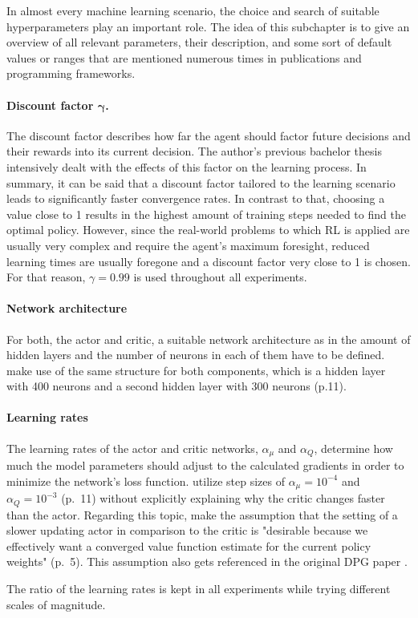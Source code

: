 In almost every machine learning scenario, the choice and search of suitable hyperparameters play an important role. The idea of this subchapter is to give an overview of all relevant parameters, their description, and some sort of default values or ranges that are mentioned numerous times in publications and programming frameworks.
\par
\paragraph{Discount factor $\boldsymbol{\gamma}$.} The discount factor describes how far the agent should factor future decisions and their rewards into its current decision. The author's previous bachelor thesis intensively dealt with the effects of this factor on the learning process. In summary, it can be said that a discount factor tailored to the learning scenario leads to significantly faster convergence rates. In contrast to that, choosing a value close to 1 results in the highest amount of training steps needed to find the optimal policy. However, since the real-world problems to which RL is applied are usually very complex and require the agent's maximum foresight, reduced learning times are usually foregone and a discount factor very close to 1 is chosen. For that reason, $\gamma = 0.99$ is used throughout all experiments.

\paragraph{Network architecture} For both, the actor and critic, a suitable network architecture as in the amount of hidden layers and the number of neurons in each of them have to be defined. \cite{lillicrap2019continuous} make use of the same structure for both components, which is a hidden layer with 400 neurons and a second hidden layer with 300 neurons (p.11).

\paragraph{Learning rates} The learning rates of the actor and critic networks, $\alpha_\mu$ and $\alpha_Q$, determine
how much the model parameters should adjust to the calculated gradients in order to minimize the network's loss function. \cite{lillicrap2019continuous} utilize step sizes of $\alpha_\mu = 10^{-4}$ and $\alpha_Q = 10^{-3}$ (p.~11) without explicitly explaining why the critic changes faster than the actor. Regarding this topic, \cite{degris2012off} make the assumption that the setting of a slower updating actor in comparison to the critic is "desirable because we  effectively want
a converged value function estimate for the current
policy weights" (p.~5). This assumption also gets referenced in the original DPG paper \cite[p.~6]{silver2014deterministic}.
\par 
The ratio of the learning rates is kept in all experiments while trying different scales of magnitude.

